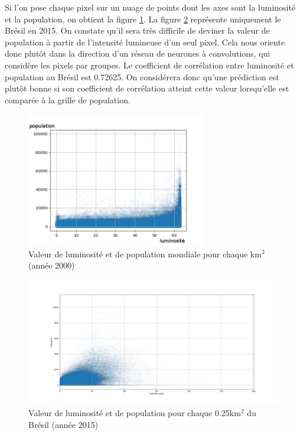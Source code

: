 \documentclass[a4paper, 11pt]{report}
\begin{document}
Si l'on pose chaque pixel sur un nuage de points dont les axes sont la luminosité et la population, on obtient la figure \ref{lightpop_scatter}. La figure \ref{2015_brazil_light_vs_pop} représente uniquement le Brésil en 2015. On constate qu'il sera très difficile de deviner la valeur de population à partir de l'intensité lumineuse d'un seul pixel. Cela nous oriente donc plutôt dans la direction d'un réseau de neurones à convolutions, qui considère les pixels par groupes. Le coefficient de corrélation entre luminosité et population au Brésil est 0.72625. On considérera donc qu'une prédiction est plutôt bonne si son coefficient de corrélation atteint cette valeur lorsqu'elle est comparée à la grille de population.

\begin{figure}
	\centering
	\includegraphics[width=0.7\textwidth]{img/lightpop_scatter.png}
	\caption{Valeur de luminosité et de population mondiale pour chaque km$^2$ (année 2000)}
	\label{lightpop_scatter}
\end{figure}

\begin{figure}
	\centering
	\includegraphics[width=\textwidth]{img/2015_brazil_light_vs_pop.png}
	\caption{Valeur de luminosité et de population pour chaque 0.25km$^2$ du Brésil (année 2015)}
	\label{2015_brazil_light_vs_pop}
\end{figure}
\end{document}
